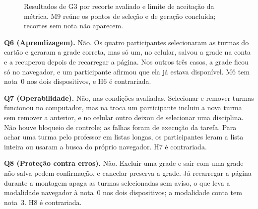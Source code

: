 \documentclass[12pt]{article}
\begin{document}
\begin{figure}[htbp]
\centering
{}
\caption{Resultados de G3 por recorte avaliado e limite de aceitação da métrica.
M9 reúne os pontos de seleção e de geração concluída; recortes sem nota não aparecem.}
\label{fig:g3}
\end{figure}

\textbf{Q6 (Aprendizagem).} Não. Os quatro participantes selecionaram as turmas
do cartão e geraram a grade correta, mas só um, no celular, salvou a grade na
conta e a recuperou depois de recarregar a página. Nos outros três casos, a grade
ficou só no navegador, e um participante afirmou que ela já estava disponível. M6
tem nota~0 nos dois dispositivos, e H6 é contrariada.

\textbf{Q7 (Operabilidade).} Não, nas condições avaliadas. Selecionar e remover
turmas funcionou no computador, mas na troca um participante incluiu a nova
turma sem remover a anterior, e no celular outro deixou de selecionar uma
disciplina. Não houve bloqueio de controle; as falhas foram de execução da
tarefa. Para achar uma turma pelo professor em listas longas, os participantes
leram a lista inteira ou usaram a busca do próprio navegador. H7 é contrariada.

\textbf{Q8 (Proteção contra erros).} Não. Excluir uma grade e sair com uma grade
não salva pedem confirmação, e cancelar preserva a grade. Já recarregar a página
durante a montagem apaga as turmas selecionadas sem aviso, o que leva a
modalidade navegador à nota~0 nos dois dispositivos; a modalidade conta tem
nota~3. H8 é contrariada.
\end{document}
